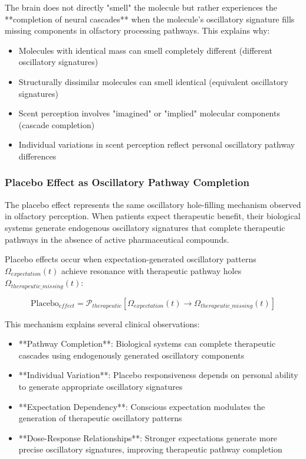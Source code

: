 The brain does not directly "smell" the molecule but rather experiences the **completion of neural cascades** when the molecule's oscillatory signature fills missing components in olfactory processing pathways. This explains why:

\begin{itemize}
\item Molecules with identical mass can smell completely different (different oscillatory signatures)
\item Structurally dissimilar molecules can smell identical (equivalent oscillatory signatures)  
\item Scent perception involves "imagined" or "implied" molecular components (cascade completion)
\item Individual variations in scent perception reflect personal oscillatory pathway differences
\end{itemize}

\subsubsection{Placebo Effect as Oscillatory Pathway Completion}

The placebo effect represents the same oscillatory hole-filling mechanism observed in olfactory perception. When patients expect therapeutic benefit, their biological systems generate endogenous oscillatory signatures that complete therapeutic pathways in the absence of active pharmaceutical compounds.

\begin{definition}
Placebo effects occur when expectation-generated oscillatory patterns $\Omega_{expectation}(t)$ achieve resonance with therapeutic pathway holes $\Omega_{therapeutic\_missing}(t)$:

\begin{equation}
\text{Placebo}_{effect} = \mathcal{P}_{therapeutic}[\Omega_{expectation}(t) \rightarrow \Omega_{therapeutic\_missing}(t)]
\end{equation}
\end{definition}

This mechanism explains several clinical observations:

\begin{itemize}
\item **Pathway Completion**: Biological systems can complete therapeutic cascades using endogenously generated oscillatory components
\item **Individual Variation**: Placebo responsiveness depends on personal ability to generate appropriate oscillatory signatures
\item **Expectation Dependency**: Conscious expectation modulates the generation of therapeutic oscillatory patterns
\item **Dose-Response Relationships**: Stronger expectations generate more precise oscillatory signatures, improving therapeutic pathway completion
\end{itemize}

